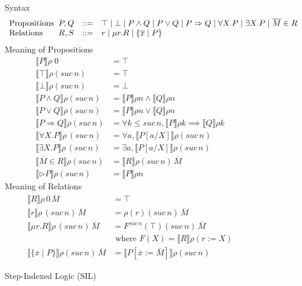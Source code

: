 \documentclass[acmsmall]{acmart}
\makeatletter
\newcommand{\sem}[1]{\llbracket #1 \rrbracket}
\newcommand{\ba}{\begin{array}}
\newcommand{\ea}{\end{array}}
\newenvironment{syntax}{\[\ba{l@{\;\;}lcl}}{\ea\]}
\newcommand{\app}{\,}
\makeatother
\begin{document}
\begin{figure}
  \raggedright
Syntax
  \begin{syntax}
    \text{Propositions} & P,Q &::= & \top \mid \bot \mid P \land Q
    \mid P \lor Q \mid P \Rightarrow Q \mid \forall X.P \mid \exists X.P
    \mid \overline{M} \in R\\
    \text{Relations} & R,S & ::= & r \mid \mu r. R \mid \{ \overline{x} \mid P \}
  \end{syntax}
Meaning of Propositions
\begin{align*}
  \sem{ P } \rho\; 0 &= \top \\
  \sem{ \top } \rho(suc \app n) &= \top \\
  \sem{ \bot } \rho (suc \app n) &= \bot \\
  \sem{ P \land Q } \rho (suc \app n) &=
    \sem{ P } \rho n \land \sem{ Q } \rho n \\
  \sem{ P \lor Q } \rho (suc \app n) &=
    \sem{ P } \rho n \lor \sem{ Q } \rho n \\
  \sem{ P \Rightarrow Q } \rho (suc \app n) &=
    \forall k \leq suc \app n,
    \sem{ P } \rho k \implies \sem{ Q } \rho k \\
  \sem{ \forall X.P} \rho \app (suc \app n) &= \forall a, \sem{P[a/X]} \rho (suc \app n)\\
  \sem{ \exists X.P} \rho \app (suc \app n) &= \exists a, \sem{P[a/X]} \rho (suc \app n)\\
  \sem{ \overline{M} \in R } \rho (suc \app n) &=
    \sem{ R } \rho (suc \app n) \app \overline{M}\\
  \sem{ \rhd P } \rho (suc \app n) &=
    \sem{ P } \rho n 
\end{align*}
Meaning of Relations
\begin{align*}
  \sem{ R } \rho\, 0 \app \overline{M} &= \top \\
  \sem{ r } \rho \app (suc \app n) \app \overline{M} &=
    \rho(r) (suc \app n) \app \overline{M} \\
  \sem{ \mu r. R } \rho \app (suc \app n)\app \overline{M} &=
  F^{suc \app n}(\top) (suc \app n) \app \overline{M} \\
  & \text{ where } F(X) = \sem{ R } \rho(r := X) \\
  \sem{ \{ \overline{x} \mid P \} } \rho (suc \app n) \app \overline{M} &= 
    \sem{ P[\overline{x} := \overline{M}] } \rho (suc \app n)
\end{align*}
  \caption{Step-Indexed Logic (SIL)}
  \label{fig:SIL}
\end{figure}
\end{document}
